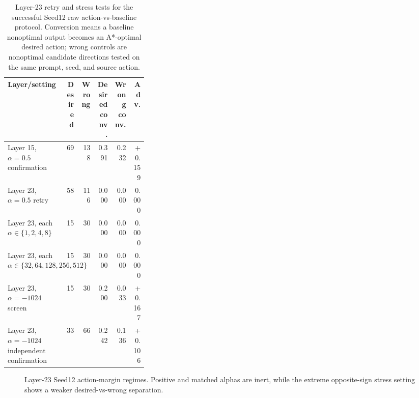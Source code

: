 \documentclass[11pt]{article}
\begin{document}
\begin{table}[t]
\centering
\small
\caption{Layer-23 retry and stress tests for the successful Seed12 raw action-vs-baseline protocol. Conversion means a baseline nonoptimal output becomes an A*-optimal desired action; wrong controls are nonoptimal candidate directions tested on the same prompt, seed, and source action.}
\label{tab:seed12_layer23_retry}
\begin{tabular}{p{0.32\linewidth}rrrrr}
\toprule
Layer/setting & Desired & Wrong & Desired conv. & Wrong conv. & Adv. \\
\midrule
Layer 15, $\alpha=0.5$ confirmation & 69 & 138 & 0.391 & 0.232 & +0.159 \\
Layer 23, $\alpha=0.5$ retry & 58 & 116 & 0.000 & 0.000 & 0.000 \\
Layer 23, each $\alpha\in\{1,2,4,8\}$ & 15 & 30 & 0.000 & 0.000 & 0.000 \\
Layer 23, each $\alpha\in\{32,64,128,256,512\}$ & 15 & 30 & 0.000 & 0.000 & 0.000 \\
Layer 23, $\alpha=-1024$ screen & 15 & 30 & 0.200 & 0.033 & +0.167 \\
Layer 23, $\alpha=-1024$ independent confirmation & 33 & 66 & 0.242 & 0.136 & +0.106 \\
\bottomrule
\end{tabular}
\end{table}

\begin{figure}[t]
\centering
{}
\caption{Layer-23 Seed12 action-margin regimes. Positive and matched alphas are inert, while the extreme opposite-sign stress setting shows a weaker desired-vs-wrong separation.}
\label{fig:seed12_layer23_stress}
\end{figure}
\end{document}
